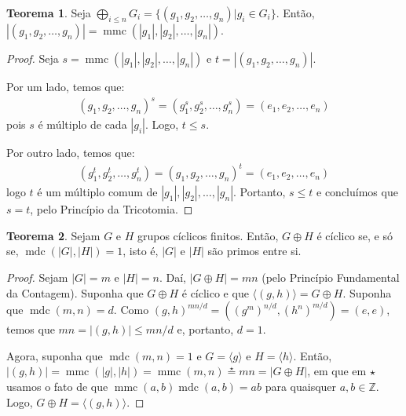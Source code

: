 \documentclass[a4paper,portuguese,11pt,twoside, leqno]{book}
\DeclareMathOperator{\mdc}{mdc}
\DeclareMathOperator{\mmc}{mmc}
\theoremstyle{definition}
\newtheorem{theorem}{Teorema}[section]
\begin{document}
	
	\begin{theorem}
		\label{ordem}
		Seja $\displaystyle{\bigoplus_{i \leq n}}G_i = \{(g_1, g_2, \dots , g_n)| g_i\in G_i \}$. Então, 
		$|(g_1, g_2, \dots , g_n)| = \mmc(|g_1|, |g_2|, \dots , |g_n|)$.
	\end{theorem}
	
	\begin{proof}
		Seja $s = \mmc(|g_1|, |g_2|, \dots , |g_n|)$ e $t = |(g_1, g_2, \dots , g_n)|$. 
		\par\vspace{0.3cm} Por um lado, temos que:
		\begin{align*}
		(g_1, g_2, \dots , g_n)^s = (g_1^s, g_2^s, \dots , g_n^s) = (e_1, e_2, \dots , e_n)
		\end{align*}
		pois $s$ é múltiplo de cada $|g_i|$. Logo, $t\leq s$.
		\par\vspace{0.3cm} Por outro lado, temos que:
		\begin{align*}
		(g_1^t, g_2^t, \dots , g_n^t) = (g_1, g_2, \dots , g_n)^t = (e_1, e_2, \dots , e_n)
		\end{align*}
		logo $t$ é um múltiplo comum de $|g_1|, |g_2|, \dots , |g_n|$. Portanto, $s\leq t$ e concluímos que $s = t$, pelo Princípio da Tricotomia. 
		
	\end{proof}
	
	
	\begin{theorem}
		\label{crit}
		Sejam $G$ e $H$ grupos cíclicos finitos. Então, $G\oplus H$ é cíclico se, e só se, $\mdc(|G|, |H|) = 1$, isto é, $|G|$ e $|H|$ são primos entre si.
	\end{theorem}
	
	\begin{proof}
		Sejam $|G| = m$ e $|H| = n$. Daí, $|G\oplus H| = mn$ (pelo Princípio Fundamental da Contagem). Suponha que $G\oplus H$ é cíclico e que $\langle (g, h) \rangle = G\oplus H$. Suponha que $\mdc(m,n) = d$. Como $(g, h)^{mn/d} = ((g^m)^{n/d} , (h^n)^{m/d}) = (e,e)$, temos que $mn = |(g, h)| \leq mn/d$ e, portanto, $d = 1$.
		
		\par\vspace{0.3cm} Agora, suponha que $\mdc(m, n) = 1$ e $G = \langle g  \rangle $ e $H = \langle h \rangle$. Então, $|(g,h)| = \mmc(|g|, |h|) = \mmc(m, n) \overset{\star}{=} mn = |G\oplus H|$, em que em $\star$ usamos o fato de que $\mmc(a,b)\mdc(a,b) = ab$ para quaisquer $a,b\in\mathbb{Z}$.
		Logo, $G\oplus H = \langle (g, h) \rangle$. 
	\end{proof}
	
\end{document}
